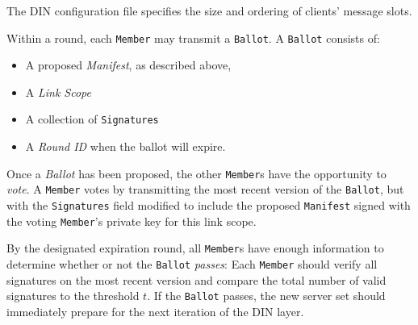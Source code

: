 The DIN configuration file specifies the size and ordering of clients' message
slots.


Within a round, each \texttt{Member} may  transmit a \texttt{Ballot}. A \texttt{Ballot}
consists of:
\begin{itemize}
  \item A proposed \emph{Manifest}, as described above,
  \item A \emph{Link Scope}
  \item A collection of \texttt{Signatures}
  \item A \emph{Round ID} when the ballot will expire.
\end{itemize}

Once a \emph{Ballot} has been proposed, the other \texttt{Member}s have the
opportunity to \emph{vote}. A \texttt{Member} votes by transmitting the most
recent version of the \texttt{Ballot}, but with the \texttt{Signatures} field
modified to include the proposed \texttt{Manifest} signed with the voting
\texttt{Member}'s private key for this link scope.

By the designated expiration round, all \texttt{Member}s have enough
information to determine whether or not the \texttt{Ballot} \emph{passes}:
Each \texttt{Member} should verify all signatures on the most recent
version
and compare the total number of valid signatures to the threshold $t$. If the
\texttt{Ballot} passes, the new server set should immediately prepare for the
next iteration of the DIN layer.

